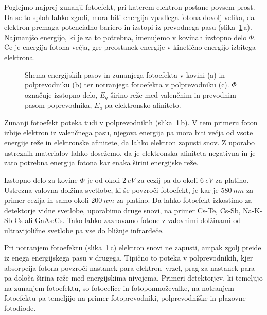 Poglejmo najprej zunanji fotoefekt, pri katerem elektron postane povsem prost. 
Da se to sploh lahko zgodi, mora biti energija vpadlega fotona dovolj velika, da 
elektron premaga potencialno bariero in izstopi iz prevodnega pasu (slika~\ref{fig:Nivoji}\,a). 
Najmanjšo energijo, ki je za to potrebna, imenujemo v kovinah izstopno delo $\Phi$. 
Če je energija fotona večja, gre preostanek energije v kinetično energijo izbitega
elektrona.

\begin{figure}[h]
\centering
\def\svgwidth{140truemm} 

\caption{Shema energijskih pasov in zunanjega fotoefekta v kovini (a) in polprevodniku (b) ter
notranjega fotoefekta v polprevodniku (c). $\Phi$ označuje izstopno delo, $E_g$ širino reže 
med valenčnim in prevodnim pasom poprevodnika,
$E_a$ pa elektronsko afiniteto. }
\label{fig:Nivoji}
\end{figure}

Zunanji fotoefekt poteka tudi v polprevodnikih (slika~\ref{fig:Nivoji}\,b). 
V tem primeru foton izbije elektron iz valenčnega pasu, njegova energija pa mora biti 
večja od vsote energije reže in elektronske afinitete, da lahko elektron zapusti snov. 
Z uporabo ustreznih materialov lahko dosežemo, da je elektronska afiniteta
negativna in je zato potrebna energija fotona kar enaka širini energijske reže.

Izstopno delo za kovine $\Phi$ je od okoli $2~\si{eV}$ za cezij pa do okoli 
$6~\si{eV}$ za platino. 
Ustrezna valovna dolžina svetlobe, ki še povzroči fotoefekt, je 
kar je $580~\si{nm}$ za primer cezija in samo okoli $200~\si{nm}$ 
za platino. Da lahko fotoefekt izkostimo za detektorje vidne svetlobe, 
uporabimo druge snovi, na primer Cs-Te, Cs-Sb, Na-K-Sb-Cs ali GaAs:Cs. 
Tako lahko zaznavamo fotone z valovnimi dolžinami od ultravijolične svetlobe 
pa vse do bližnje infrardeče.

Pri notranjem fotoefektu (slika~\ref{fig:Nivoji}\,c) elektron 
snovi ne zapusti, ampak zgolj preide iz enega 
energijskega pasu v drugega. Tipično to poteka v polprevodnikih, kjer absorpcija fotona 
povzroči nastanek para elektron--vrzel, prag za nastanek para pa določa širina reže med 
energijskima nivojema. Primeri detektorjev, ki temeljijo na zunanjem fotoefektu, so 
fotocelice in fotopomnoževalke, na notranjem fotoefektu pa temeljijo na primer
fotoprevodniki, polprevodniške in plazovne fotodiode.

